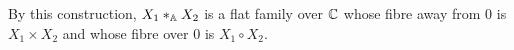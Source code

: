 \documentclass[draft]{article}
\begin{document}
By this construction, $X_1 \ast_{\AA} X_2 $ is a flat family over $\CC$ whose fibre away from $0$ is $X_1 \times X_2$ and whose fibre over $ 0$ is $ X_1 \circ X_2$.



\end{document}
